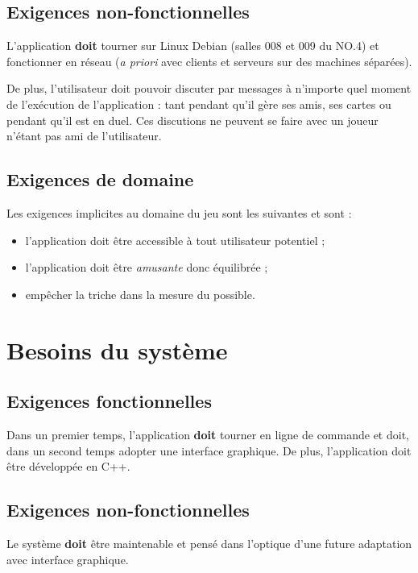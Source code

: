 \documentclass{article}
\begin{document}
    \subsection{Exigences non-fonctionnelles}
        L'application \textbf{doit} tourner sur Linux Debian (salles 008 et 009 du NO.4) et fonctionner en réseau (\textit{a priori} avec clients
        et serveurs sur des machines séparées).

        De plus, l'utilisateur doit pouvoir discuter par messages à n'importe quel moment de l'exécution de l'application : tant pendant
        qu'il gère ses amis, ses cartes ou pendant qu'il est en \gls{duel}. Ces discutions ne peuvent se faire avec un joueur
        n'étant pas ami de l'utilisateur.

    \subsection{Exigences de domaine}
        Les exigences implicites au domaine du jeu sont les suivantes et sont \textbf{} :

        \begin{itemize}
            \item l'application doit être accessible à tout utilisateur potentiel ;
            \item l'application doit être \textit{amusante} donc équilibrée ;
            \item empêcher la triche dans la mesure du possible.
        \end{itemize}

\section{Besoins du système}
    \subsection{Exigences fonctionnelles}
        Dans un premier temps, l'application \textbf{doit} tourner en ligne de commande et doit, dans un second temps adopter une interface
        graphique. De plus, l'application doit être développée en C++.

    \subsection{Exigences non-fonctionnelles}
        Le système \textbf{doit} être maintenable et pensé dans l'optique d'une future adaptation avec interface graphique.
\end{document}
